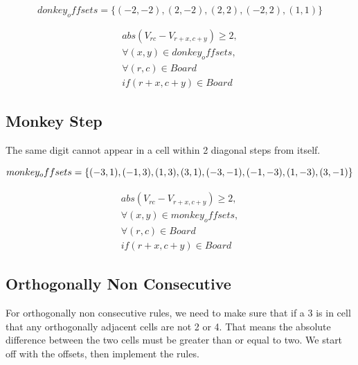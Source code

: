 \documentclass{article}
\begin{document}
\begin{equation}
donkey_offsets = \lbrace  (-2,-2), (2,-2), (2, 2),  (-2,2), (1,1) \rbrace
\end{equation}

\begin{equation}
\begin{split}
abs (V_{rc} - V_{r+x,c+y}) \geq 2, \\ 
\forall (x,y) \in donkey_offsets, \\ 
\forall (r,c) \in Board \\
 if (r+x, c+y) \in Board
\end{split}
\end{equation}


\subsection{Monkey Step}

The same digit cannot appear in a cell within 2 diagonal steps from itself.

\begin{equation}
monkey_offsets = \lbrace (-3,1), (-1,3), (1, 3), (3,1), \\
(-3,-1), (-1,-3), (1,- 3), (3,-1) \rbrace
\end{equation}

\begin{equation}
\begin{split}
abs (V_{rc} - V_{r+x,c+y}) \geq 2, \\ 
\forall (x,y) \in monkey_offsets, \\ 
\forall (r,c) \in Board \\
 if (r+x, c+y) \in Board
\end{split}
\end{equation}



\subsection{Orthogonally Non Consecutive}

For orthogonally non consecutive rules, we need to make sure that if a 3 is in cell that any orthogonally adjacent cells are not 2 or 4.
That means the absolute difference between the two cells must be greater than or equal to two. We start off with the offsets, then implement the rules.
\end{document}
